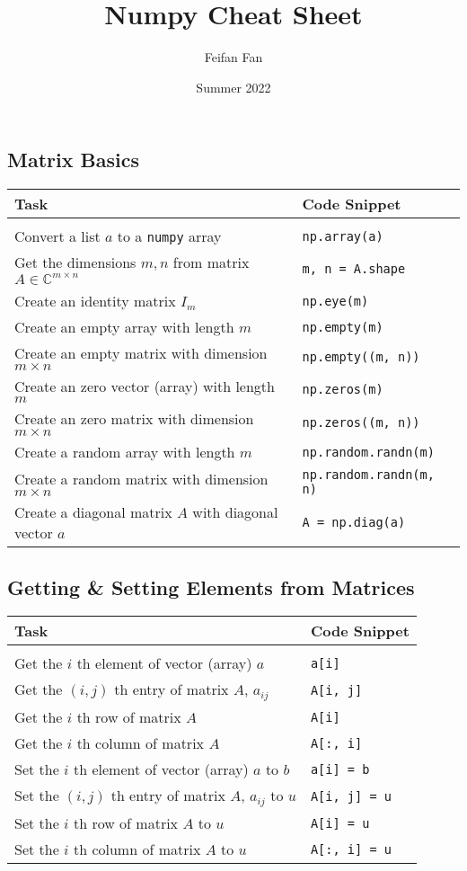 \documentclass[a4paper,11pt]{article}
\begin{document}
\title{Numpy Cheat Sheet}
\author{Feifan Fan}
\date{Summer 2022}
\maketitle
\subsection*{Matrix Basics}
\begin{tabular}{p{9cm} |p{5cm}}
Task & Code Snippet \\
\hline \\
Convert a list $a$ to a \texttt{numpy} array & \texttt{np.array(a)} \\
Get the dimensions \(m, n\) from matrix \(A \in \mathbb{C}^{m\times n}\) & \texttt{m, n = A.shape} \\
Create an identity matrix \(I_m\) & \texttt{np.eye(m)}  \\
Create an empty array with length $m$ & \texttt{np.empty(m)}  \\
Create an empty matrix with dimension $m \times  n$ & \texttt{np.empty((m, n))}\\
Create an zero vector (array) with length \(m\) & \texttt{np.zeros(m)} \\
Create an zero matrix with dimension \(m \times n\)& \texttt{np.zeros((m, n))}\\
Create a random array with length $m$ & \texttt{np.random.randn(m)}  \\
Create a random matrix with dimension \(m \times n\)& \texttt{np.random.randn(m, n)}\\
Create a diagonal matrix $A$ with diagonal vector $a$ &  \texttt{A = np.diag(a)} \\
\end{tabular}
\subsection*{Getting \& Setting Elements from Matrices}
\begin{tabular}{p{9cm} |p{5cm}}
  Task & Code Snippet \\
  \hline \\
Get the $i$ th element of vector (array) $a$ & \texttt{a[i]} \\
Get the $(i, j)$ th entry of matrix $A$,  $a_{ij}$ &  \texttt{A[i, j]}\\
Get the $i$ th row of matrix $A$ & \texttt{A[i]} \\
Get the $i$ th column of matrix $A$ &  \texttt{A[:, i]}\\
Set the $i$ th element of vector (array) $a$ to $b$ & \texttt{a[i] = b} \\
Set the $(i, j)$ th entry of matrix $A$,  $a_{ij}$ to $u$&  \texttt{A[i, j] = u}\\
Set the $i$ th row of matrix $A$ to $u$ & \texttt{A[i] = u}\\
Set the $i$ th column of matrix $A$ to $u$ & \texttt{A[:, i] = u} \\
\end{tabular}
\newpage
\end{document}
